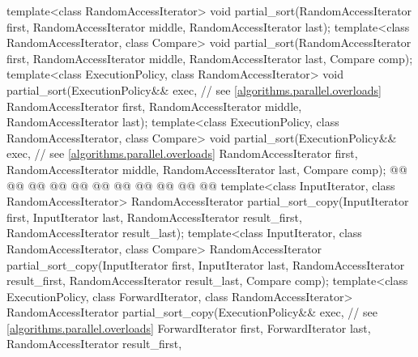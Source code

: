 \begin{codeblock}
{  template<class RandomAccessIterator>
    void partial_sort(RandomAccessIterator first,
                      RandomAccessIterator middle,
                      RandomAccessIterator last);
  template<class RandomAccessIterator, class Compare>
    void partial_sort(RandomAccessIterator first,
                      RandomAccessIterator middle,
                      RandomAccessIterator last, Compare comp);
  template<class ExecutionPolicy, class RandomAccessIterator>
    void partial_sort(ExecutionPolicy&& exec, // see \ref{algorithms.parallel.overloads}
                      RandomAccessIterator first,
                      RandomAccessIterator middle,
                      RandomAccessIterator last);
  template<class ExecutionPolicy, class RandomAccessIterator, class Compare>
    void partial_sort(ExecutionPolicy&& exec, // see \ref{algorithms.parallel.overloads}
                      RandomAccessIterator first,
                      RandomAccessIterator middle,
                      RandomAccessIterator last, Compare comp);
  @@
    @@
        @@
      @@
      @@
    @@
      @@
      @@
        @@
                    @@
  @\added{\}}@
  template<class InputIterator, class RandomAccessIterator>
    RandomAccessIterator
      partial_sort_copy(InputIterator first, InputIterator last,
                        RandomAccessIterator result_first,
                        RandomAccessIterator result_last);
  template<class InputIterator, class RandomAccessIterator, class Compare>
    RandomAccessIterator
      partial_sort_copy(InputIterator first, InputIterator last,
                        RandomAccessIterator result_first,
                        RandomAccessIterator result_last,
                        Compare comp);
  template<class ExecutionPolicy, class ForwardIterator, class RandomAccessIterator>
    RandomAccessIterator
      partial_sort_copy(ExecutionPolicy&& exec,  // see \ref{algorithms.parallel.overloads}
                        ForwardIterator first, ForwardIterator last,
                        RandomAccessIterator result_first,
}
\end{codeblock}
